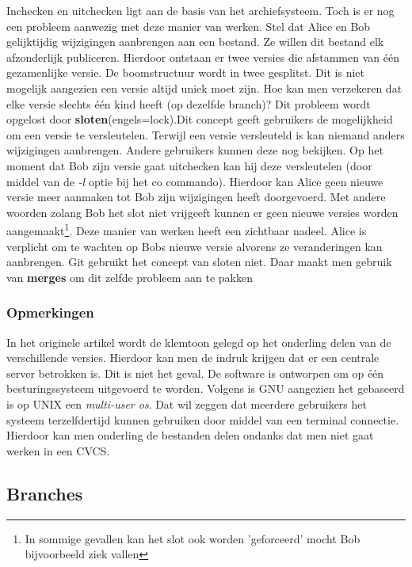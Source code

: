 Inchecken en uitchecken ligt aan de basis van het archiefsysteem. Toch is er nog een probleem aanwezig met deze manier van werken. Stel dat Alice en Bob gelijktijdig wijzigingen aanbrengen aan een bestand. Ze willen dit bestand elk afzonderlijk publiceren.  Hierdoor ontstaan er twee versies die afstammen van één gezamenlijke versie. De boomstructuur wordt in twee gesplitst. Dit is niet mogelijk aangezien een versie altijd uniek moet zijn. Hoe kan men verzekeren dat elke versie slechts één kind heeft (op dezelfde branch)? Dit probleem wordt opgelost door \textbf{sloten}(engels=lock).Dit concept geeft gebruikers de mogelijkheid om een versie te  versleutelen. Terwijl een versie versleuteld is kan niemand anders wijzigingen aanbrengen. Andere gebruikers kunnen deze nog bekijken. Op het moment dat Bob zijn versie gaat uitchecken kan hij deze versleutelen (door middel van de \textit{-l} optie bij het co commando). Hierdoor kan Alice geen nieuwe versie meer aanmaken tot Bob zijn wijzigingen heeft doorgevoerd. Met andere woorden zolang Bob het slot niet vrijgeeft kunnen er geen nieuwe versies worden aangemaakt\footnote{In sommige gevallen kan het slot ook worden 'geforceerd' mocht Bob bijvoorbeeld ziek vallen}. Deze manier van werken heeft een zichtbaar nadeel. Alice is verplicht om te wachten op Bobs nieuwe versie alvorens ze veranderingen kan aanbrengen. Git gebruikt het concept van sloten niet. Daar maakt men gebruik van \textbf{merges} om dit zelfde probleem aan te pakken %

\subsubsection{Opmerkingen}
In het originele artikel wordt de klemtoon gelegd op het onderling delen van de verschillende versies. Hierdoor kan men de indruk krijgen dat er een centrale server betrokken is. Dit is niet het geval. De software is ontworpen om op één besturingssysteem uitgevoerd te worden. Volgens \textcite{Debian2020} is GNU aangezien het gebaseerd is op UNIX een \textit{multi-user os}. Dat wil zeggen dat meerdere gebruikers het systeem terzelfdertijd kunnen gebruiken door middel van een terminal connectie. Hierdoor kan men onderling de bestanden delen ondanks dat men niet gaat werken in een CVCS.

\subsection{Branches}
\label{par:branches}
